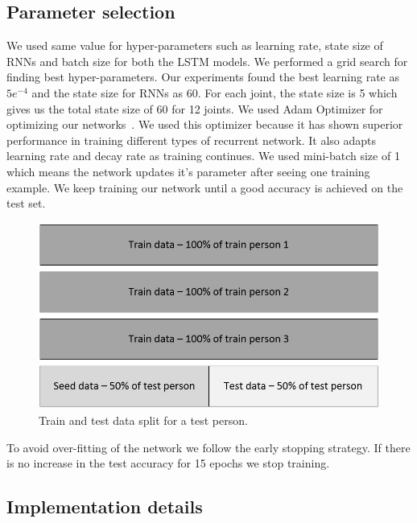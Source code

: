 \documentclass[10pt,twocolumn,letterpaper]{article}
\begin{document}
\subsection{Parameter selection}

We used same value for hyper-parameters such as learning rate, state size of RNNs and batch size  for both the LSTM models. We performed 
a grid search for finding best hyper-parameters. Our experiments found the best learning rate as $5e^{-4}$ and the state size for RNNs as 60. For each joint, the state size is 5 which gives us the total 
state size of 60 for 12 joints. We used Adam Optimizer for optimizing our networks~\cite{DBLP:journals/corr/KingmaB14}. We used this 
optimizer because it has shown superior performance in training different types of recurrent network. It also adapts learning rate and 
decay rate as training continues. We used mini-batch size of 1 which means the network updates it's parameter after seeing one training example. We keep training our network until a good accuracy is achieved on the test set.
\begin{figure}[h]
	\begin{center}
		\includegraphics[width=\linewidth, height=.2\textheight]{train_test_dat}
	\end{center}
	\caption{Train and test data split for a test person.}
	\label{fig:train_test_dat}
\end{figure}
To avoid over-fitting of the network we follow the 
early stopping strategy. If there is no increase in the test accuracy for 15 epochs  we  stop training. 

\subsection{Implementation details}
\end{document}

